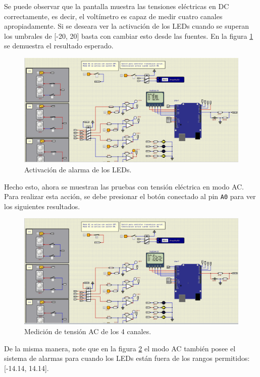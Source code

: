Se puede observar que la pantalla muestra las tensiones eléctricas en DC correctamente, es decir, el voltímetro es capaz de medir cuatro canales apropiadamente. Si se deseara ver la activación de los LEDs cuando se superan los umbrales de [-20, 20] basta con cambiar esto desde las fuentes. En la figura \ref{fig_10} se demuestra el resultado esperado.
\begin{figure}[H]
    \centering
    \includegraphics[width=.8\linewidth]{Imagenes/10.png}
    \caption{Activación de alarma de los LEDs.}
    \label{fig_10}
\end{figure}
Hecho esto, ahora se muestran las pruebas con tensión eléctrica en modo AC. Para realizar esta acción, se debe presionar el botón conectado al pin \texttt{A0} para ver los siguientes resultados.
\begin{figure}[H]
    \centering
    \includegraphics[width=.8\linewidth]{Imagenes/11.png}
    \caption{Medición de tensión AC de los 4 canales.}
    \label{fig_11}
\end{figure}
De la misma manera, note que en la figura \ref{fig_11} el modo AC también posee el sistema de alarmas para cuando los LEDs están fuera de los rangos permitidos: [-14.14, 14.14].\par

